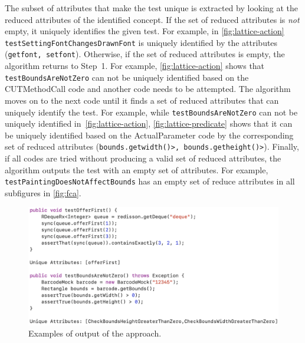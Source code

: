 The subset of attributes that make the test unique is extracted by looking at the reduced attributes of the identified concept.
%
If the set of reduced attributes is \emph{not} empty, it uniquely identifies the given test.
%
For example, in \cref{fig:lattice-action} \texttt{test\-Setting\-Font\-Changes\-Drawn\-Font} is uniquely identified by the attributes (\texttt{getfont, setfont}).
% 
Otherwise, if the set of reduced attributes is empty, the algorithm returns to Step~1.
%
For example, \cref{fig:lattice-action} shows that \texttt{test\-Bounds\-Are\-Not\-Zero} can not be uniquely identified based on the CUTMethodCall code and another code needs to be attempted.
%
The algorithm moves on to the next code until it finds a set of reduced attributes that can uniquely identify the test.
%
For example, while \texttt{test\-Bounds\-Are\-Not\-Zero} can not be uniquely identified in~\cref{fig:lattice-action}, \cref{fig:lattice-predicate} shows that it can be uniquely identified based on the ActualParameter code by the corresponding set of reduced attributes (\texttt{bounds.getwidth()\->, bounds.getheight()\->}).
% 
Finally, if all codes are tried without producing a valid set of reduced attributes, the algorithm outputs the test with an empty set of attributes.
%
For example, \texttt{test\-Painting\-Does\-Not\-Affect\-Bounds} has an empty set of reduce attributes in all subfigures in \cref{fig:fca}.


\begin{figure}[t]
\centering
\includegraphics[scale=0.35]{figures/approach_output.png}
\caption{Examples of output of the approach.}
\label{fig:output-approach}
\end{figure}


